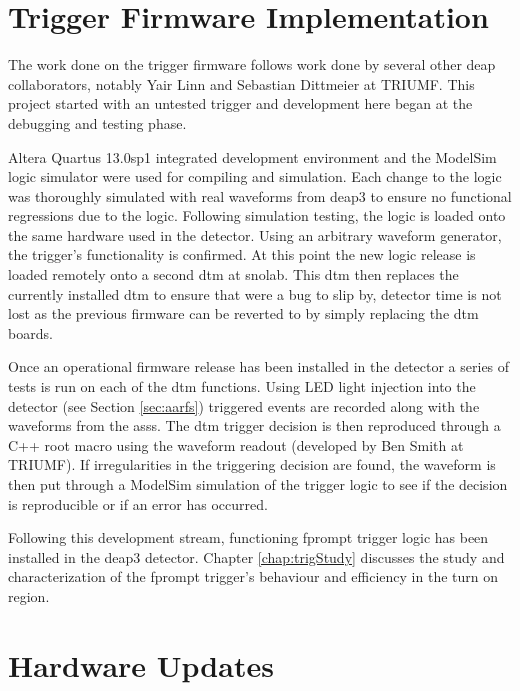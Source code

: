 \section{Trigger Firmware Implementation}
The work done on the trigger firmware follows work done by several other \gls{deap} collaborators, notably Yair Linn and Sebastian Dittmeier at TRIUMF. This project started with an untested trigger and development here began at the debugging and testing phase.

Altera Quartus 13.0sp1 integrated development environment and the ModelSim logic simulator were used for compiling and simulation. Each change to the logic was thoroughly simulated with real waveforms from \gls{deap3} to ensure no functional regressions due to the logic. Following simulation testing, the logic is loaded onto the same hardware used in the detector. Using an arbitrary waveform generator, the trigger's functionality is confirmed. At this point the new logic release is loaded remotely onto a second \gls{dtm} at \gls{snolab}. This \gls{dtm} then replaces the currently installed \gls{dtm} to ensure that were a bug to slip by, detector time is not lost as the previous firmware can be reverted to by simply replacing the \gls{dtm} boards.

Once an operational firmware release has been installed in the detector a series of tests is run on each of the \gls{dtm} functions. Using LED light injection into the detector (see Section \ref{sec:aarfs}) triggered events are recorded along with the waveforms from the \gls{ass}s. The \gls{dtm} trigger decision is then reproduced through a C++ \gls{root} macro \cite{root} using the waveform readout (developed by Ben Smith at TRIUMF). If irregularities in the triggering decision are found, the waveform is then put through a ModelSim simulation of the trigger logic to see if the decision is reproducible or if an error has occurred.



Following this development stream, functioning \gls{fprompt} trigger logic has been installed in the \gls{deap3} detector. Chapter \ref{chap:trigStudy} discusses the study and characterization of the \gls{fprompt} trigger's behaviour and efficiency in the turn on region.


\section{Hardware Updates}
\label{sec:newClock}

